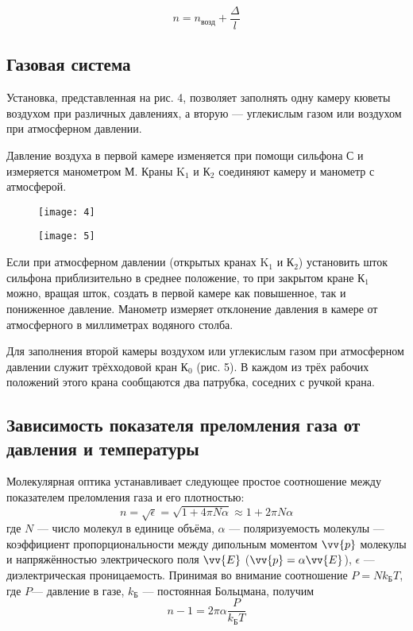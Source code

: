 \documentclass[a4paper, 12pt]{article}
\begin{document}
\begin{equation}
    n = n_\text{возд} + \frac{\Delta}{l}
\end{equation}

\subsection*{Газовая система}
Установка, представленная на рис. 4, позволяет заполнять одну камеру
кюветы воздухом при различных давлениях, а вторую — углекислым газом
или воздухом при атмосферном давлении.

Давление воздуха в первой камере изменяется при помощи сильфона С и
измеряется манометром М. Краны K$_1$ и К$_2$ соединяют камеру и манометр с
атмосферой. 


\begin{figure}[H]
    \begin{floatrow}

        {
        \texttt{[image: 4]}
    }

        {
        \texttt{[image: 5]}
    }
    \end{floatrow}
\end{figure}
Если при атмосферном давлении (открытых кранах K$_1$ и К$_2$) установить
шток сильфона приблизительно в среднее положение, то при закрытом
кране К$_1$ можно, вращая шток, создать в первой камере как повышенное,
так и пониженное давление. Манометр измеряет отклонение давления в
камере от атмосферного в миллиметрах водяного столба.

Для заполнения второй камеры воздухом или углекислым газом при
атмосферном давлении служит трёхходовой кран К$_0$ (рис. 5). В каждом из
трёх рабочих положений этого крана сообщаются два патрубка, соседних с
ручкой крана.

\subsection*{Зависимость показателя преломления газа от давления и
температуры}
Молекулярная оптика устанавливает следующее простое соотношение между
показателем преломления газа и его плотностью:
\begin{equation}
    n = \sqrt{\epsilon} = \sqrt{1+4\pi N \alpha} \approx 1 + 2\pi N
    \alpha
\end{equation}
где $N$ — число молекул в единице объёма, $\alpha$ — поляризуемость молекулы —
коэффициент пропорциональности между дипольным моментом $\vv{p}$ молекулы и
напряжённостью электрического поля $\vv{E}$ ($\vv{p}=\alpha \vv{E}$), $\epsilon$ — диэлектрическая
проницаемость. Принимая во внимание соотношение $P=Nk_\text{Б}T$, где
$P$—
давление в газе, $k_\text{Б}$ — постоянная Больцмана, получим 
\begin{equation}
    n-1 = 2\pi \alpha \frac{P}{k_\text{Б}T}
    \label{eq:6}
\end{equation}
\end{document}
